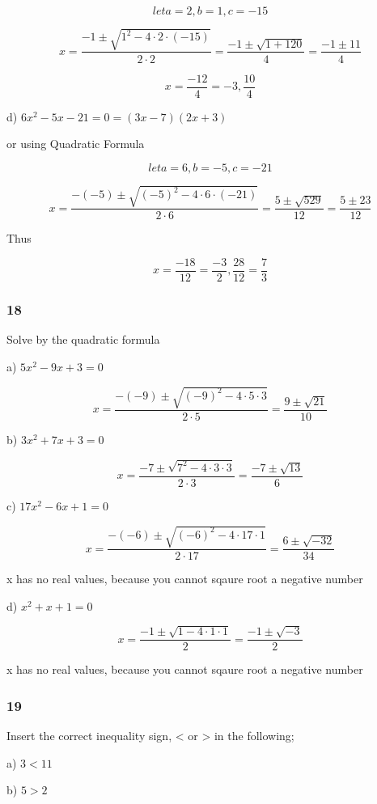 \documentclass[]{report}
\begin{document}
\[
let a=2, b=1, c=-15
\]

\[
x = \frac{-1 \pm \sqrt{1^2 - 4\cdot2\cdot(-15)}}{2\cdot2} = \frac{-1 \pm \sqrt{1 + 120}}{4} = \frac{-1 \pm 11}{4}
\]

\[
x = \frac{-12}{4} = -3, \frac{10}{4}
\]

d) $6x^2 - 5x -21 = 0 = (3x - 7)(2x + 3)$

or using Quadratic Formula

\[
let a=6, b=-5, c=-21
\]

\[
x = \frac{-(-5) \pm \sqrt{(-5)^2 - 4\cdot6\cdot(-21)}}{2\cdot6} = \frac{5 \pm \sqrt{529}}{12} = \frac{5 \pm 23}{12}
\]

Thus

\[
x=\frac{-18}{12} = \frac{-3}{2}, \frac{28}{12} = \frac{7}{3}
\]



\subsubsection{18}

Solve by the quadratic formula

a) $5x^2 - 9x + 3 = 0 $

\[
x = \frac{-(-9) \pm \sqrt{(-9)^2 - 4\cdot5\cdot3}}{2\cdot5} = \frac{9 \pm \sqrt{21}}{10}
\]

b) $3x^2 + 7x + 3 = 0$

\[
x = \frac{-7 \pm \sqrt{7^2 - 4\cdot3\cdot3}}{2\cdot3} = \frac{-7 \pm \sqrt{13}}{6}
\]

c) $17x^2 - 6x + 1 = 0$

\[
x = \frac{-(-6) \pm \sqrt{(-6)^2 - 4\cdot17\cdot1}}{2\cdot17} = \frac{6 \pm \sqrt{-32}}{34}
\]

x has no real values, because you cannot sqaure root a negative number


d) $x^2 + x + 1 = 0$

\[
x = \frac{-1 \pm \sqrt{1 - 4\cdot1\cdot1}}{2} = \frac{-1 \pm \sqrt{-3}}{2}
\]

x has no real values, because you cannot sqaure root a negative number

\subsubsection{19}

Insert the correct inequality sign, < or > in the following;

a) $ 3 < 11$

b) $5 > 2$
\end{document}
